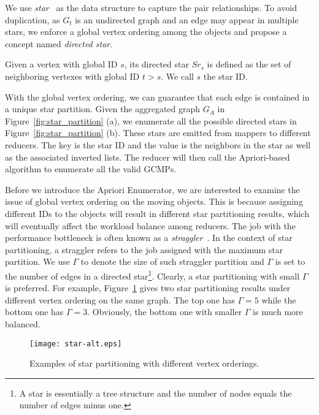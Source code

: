 We use \emph{star}~\cite{yoo2006joinless} as the data structure to capture the pair relationships. 
To avoid duplication, as $G_t$ is an undirected graph and an edge may appear in multiple stars, 
we enforce a global vertex ordering among the objects and propose a concept named \textit{directed star}.

\begin{definition}
Given a vertex with global ID $s$, its directed star $Sr_s$ is defined as the set of neighboring vertexes with global ID $t>s$. We call $s$ the star ID.
\end{definition}

With the global vertex ordering, we can guarantee that each edge is contained in a unique star partition. Given the aggregated graph $G_A$  in Figure~\ref{fig:star_partition} (a), we enumerate all the possible directed stars in Figure~\ref{fig:star_partition} (b). These stars are emitted from mappers to different reducers. The key is the star ID and the value is the neighbors in the star as well as the associated inverted lists. 
The reducer will then call the Apriori-based algorithm to enumerate all the valid GCMPs.


Before we introduce the Apriori Enumerator, we are interested to 
examine the issue of global vertex ordering on the moving objects.
This is because assigning different IDs to the objects will result in 
different star partitioning results, which will eventually affect the workload 
balance among reducers. The job with the performance bottleneck is often known as a  \emph{straggler}~\cite{kwon2012skewtune,coppa2015data}. In the context of star partitioning, a straggler refers to the job assigned with the maximum star partition. We use $\Gamma$ to denote the size of such straggler partition and $\Gamma$ is set to the number of edges in a directed star\footnote{A star is essentially a tree structure and the number of nodes equals the number of edges minus one.}. Clearly, a star partitioning with small $\Gamma$ is preferred. For example, Figure~\ref{fig:star-alt} gives two star partitioning results under 
different vertex ordering on the same graph. The top one has $\Gamma = 5$ while the bottom one has $\Gamma = 3$. Obviously, the bottom one with smaller $\Gamma$ is much more balanced.

\begin{figure}[h]
\centering
\texttt{[image: star-alt.eps]}
\caption{Examples of star partitioning with different vertex orderings.}
\label{fig:star-alt}
\end{figure}

